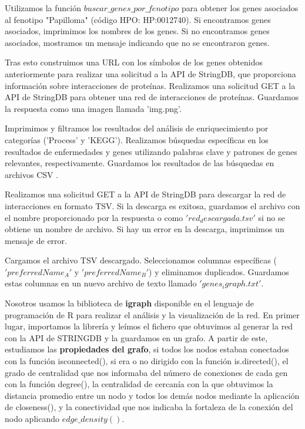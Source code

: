 Utilizamos la función $buscar\_genes\_por\_fenotipo$ para obtener los genes asociados al fenotipo "Papilloma" (código HPO: HP:0012740).
Si encontramos genes asociados, imprimimos los nombres de los genes. Si no encontramos genes asociados, mostramos un mensaje indicando que no se encontraron genes.

Tras esto construimos una URL con los símbolos de los genes obtenidos anteriormente para realizar una solicitud a la API de StringDB, que proporciona información sobre interacciones de proteínas.
Realizamos una solicitud GET a la API de StringDB para obtener una red de interacciones de proteínas.
Guardamos la respuesta como una imagen llamada 'img.png'.

Imprimimos y filtramos los resultados del análisis de enriquecimiento por categorías ('Process' y 'KEGG').
Realizamos búsquedas específicas en los resultados de enfermedades y genes utilizando palabras clave y patrones de genes relevantes, respectivamente.
Guardamos los resultados de las búsquedas en archivos CSV .

Realizamos una solicitud GET a la API de StringDB para descargar la red de interacciones en formato TSV.
Si la descarga es exitosa, guardamos el archivo con el nombre proporcionado por la respuesta o como $'red_descargada.tsv'$ si no se obtiene un nombre de archivo.
Si hay un error en la descarga, imprimimos un mensaje de error.

Cargamos el archivo TSV descargado.
Seleccionamos columnas específicas ($'preferredName_A'$ y $'preferredName_B'$) y eliminamos duplicados.
Guardamos estas columnas en un nuevo archivo de texto llamado $'genes_igraph.txt'$.

Nosotros usamos la biblioteca de \textbf{igraph} disponible en el lenguaje de programación de R para realizar el análisis y la visualización de la red. En primer lugar, importamos la librería y leímos el fichero que obtuvimos al generar la red con la API de STRINGDB y la guardamos en un grafo. A partir de este, estudiamos las \textbf{propiedades del grafo}, si todos los nodos estaban conectados con la función isconnected(), si era o no dirigido con la función is.directed(), el grado de centralidad que nos informaba del número de conexiones de cada gen con la función degree(), la centralidad de cercanía con la que obtuvimos la distancia promedio entre un nodo y todos los demás nodos mediante la aplicación de closeness(), y la conectividad que nos indicaba la fortaleza de la conexión del nodo aplicando $edge\_density()$. 

